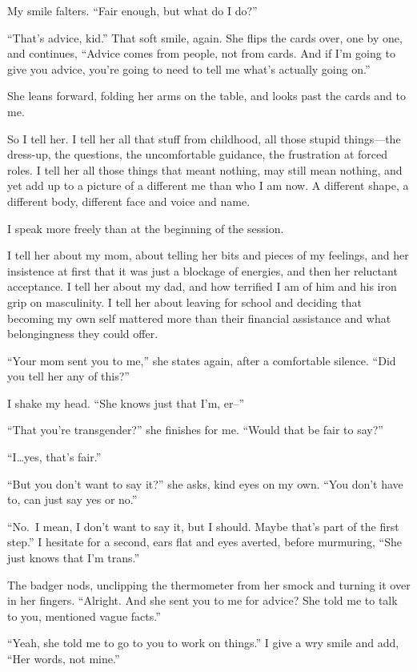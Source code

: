 My smile falters. ``Fair enough, but what do I do?''

``That's advice, kid.'' That soft smile, again. She flips the cards over, one by one, and continues, ``Advice comes from people, not from cards. And if I'm going to give you advice, you're going to need to tell me what's actually going on.''

She leans forward, folding her arms on the table, and looks past the cards and to me.

So I tell her. I tell her all that stuff from childhood, all those stupid things---the dress-up, the questions, the uncomfortable guidance, the frustration at forced roles. I tell her all those things that meant nothing, may still mean nothing, and yet add up to a picture of a different me than who I am now. A different shape, a different body, different face and voice and name.

I speak more freely than at the beginning of the session.

I tell her about my mom, about telling her bits and pieces of my feelings, and her insistence at first that it was just a blockage of energies, and then her reluctant acceptance. I tell her about my dad, and how terrified I am of him and his iron grip on masculinity. I tell her about leaving for school and deciding that becoming my own self mattered more than their financial assistance and what belongingness they could offer.

``Your mom sent you to me,'' she states again, after a comfortable silence. ``Did you tell her any of this?''

I shake my head. ``She knows just that I'm, er--''

``That you're transgender?'' she finishes for me. ``Would that be fair to say?''

``I\ldots{}yes, that's fair.''

``But you don't want to say it?'' she asks, kind eyes on my own. ``You don't have to, can just say yes or no.''

``No.~I mean, I don't want to say it, but I should. Maybe that's part of the first step.'' I hesitate for a second, ears flat and eyes averted, before murmuring, ``She just knows that I'm trans.''

The badger nods, unclipping the thermometer from her smock and turning it over in her fingers. ``Alright. And she sent you to me for advice? She told me to talk to you, mentioned vague facts.''

``Yeah, she told me to go to you to work on things.'' I give a wry smile and add, ``Her words, not mine.''

